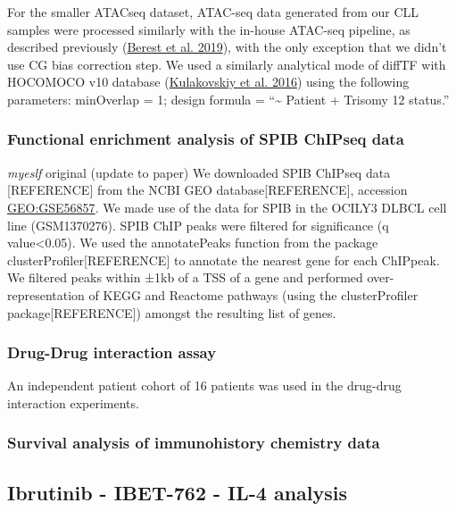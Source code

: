 \documentclass[11pt, a4paper, twosided]{book}
\begin{document}
For the smaller ATACseq dataset, ATAC-seq data generated from our CLL samples were processed similarly with the in-house ATAC-seq pipeline, as described previously (\protect\hyperlink{ref-Berest2019}{Berest et al. 2019}), with the only exception that we didn't use CG bias correction step. We used a similarly analytical mode of diffTF with HOCOMOCO v10 database (\protect\hyperlink{ref-HOCOMOCO}{Kulakovskiy et al. 2016}) using the following parameters: minOverlap = 1; design formula = ``\textasciitilde{} Patient + Trisomy 12 status.''

\hypertarget{functional-enrichment-analysis-of-spib-chipseq-data}{%
\subsubsection{Functional enrichment analysis of SPIB ChIPseq data}\label{functional-enrichment-analysis-of-spib-chipseq-data}}

\emph{myeslf} original (update to paper)
We downloaded SPIB ChIPseq data {[}REFERENCE{]} from the NCBI GEO database{[}REFERENCE{]}, accession \url{GEO:GSE56857}. We made use of the data for SPIB in the OCILY3 DLBCL cell line (GSM1370276). SPIB ChIP peaks were filtered for significance (q value\textless0.05). We used the annotatePeaks function from the package clusterProfiler{[}REFERENCE{]} to annotate the nearest gene for each ChIPpeak. We filtered peaks within ±1kb of a TSS of a gene and performed over-representation of KEGG and Reactome pathways (using the clusterProfiler package{[}REFERENCE{]}) amongst the resulting list of genes.

\hypertarget{drug-drug-interaction-assay}{%
\subsubsection{Drug-Drug interaction assay}\label{drug-drug-interaction-assay}}

An independent patient cohort of 16 patients was used in the drug-drug interaction experiments.

\hypertarget{survival-analysis-of-immunohistory-chemistry-data}{%
\subsubsection{Survival analysis of immunohistory chemistry data}\label{survival-analysis-of-immunohistory-chemistry-data}}

\hypertarget{ibrutinib---ibet-762---il-4-analysis}{%
\subsection{Ibrutinib - IBET-762 - IL-4 analysis}\label{ibrutinib---ibet-762---il-4-analysis}}
\end{document}
